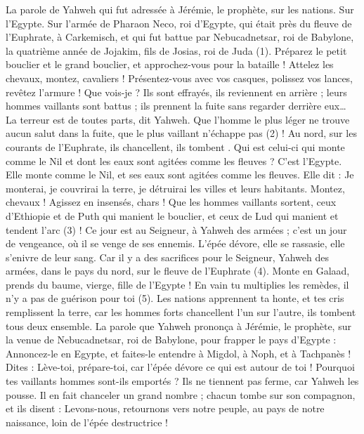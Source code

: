 \begin{multicols}{2}
\VerseOne{}La parole de Yahweh qui fut adressée à Jérémie, le prophète, sur les nations.
Sur l'Egypte. Sur l'armée de Pharaon Neco, roi d'Egypte, qui était près du fleuve de l’Euphrate, à Carkemisch, et qui fut battue par Nebucadnetsar, roi de Babylone, la quatrième année de Jojakim, fils de Josias, roi de Juda\FTNT{} (1).
Préparez le petit bouclier et le grand bouclier, et approchez-vous pour la bataille !
Attelez les chevaux, montez, cavaliers ! Présentez-vous avec vos casques, polissez vos lances, revêtez l’armure !
Que vois-je ? Ils sont effrayés, ils reviennent en arrière ; leurs hommes vaillants sont battus ; ils prennent la fuite sans regarder derrière eux… La terreur est de toutes parts,  dit Yahweh.
Que l'homme le plus léger ne trouve aucun salut dans la fuite, que le plus vaillant n’échappe pas\FTNT{} (2) ! Au nord, sur les courants de l'Euphrate, ils chancellent, ils tombent .
Qui est celui-ci qui monte comme le Nil et dont les eaux sont agitées comme les fleuves ?
C'est l'Egypte. Elle monte comme le Nil, et ses eaux sont agitées comme les fleuves. Elle dit : Je monterai, je couvrirai la terre, je détruirai les villes et leurs habitants.
Montez, chevaux ! Agissez en insensés, chars ! Que les hommes vaillants sortent, ceux d’Ethiopie et de Puth qui manient le bouclier, et ceux de  Lud qui manient et tendent l'arc\FTNT{} (3) !
Ce jour est au Seigneur, à Yahweh des armées ; c’est un jour de vengeance, où il se venge de ses ennemis. L'épée dévore, elle se rassasie, elle s’enivre de leur sang. Car il y a des sacrifices pour le Seigneur, Yahweh des armées, dans le pays du nord, sur le fleuve de l’Euphrate\FTNT{} (4).
Monte en Galaad, prends du baume, vierge, fille de l'Egypte ! En vain tu multiplies les remèdes, il n'y a pas de guérison pour toi\FTNT{} (5).
Les nations apprennent ta honte, et tes cris remplissent la terre, car les hommes forts chancellent l’un sur l’autre, ils tombent tous deux ensemble.
La parole que Yahweh prononça à Jérémie, le prophète, sur la venue de Nebucadnetsar, roi de Babylone, pour frapper le pays d'Egypte :
Annoncez-le en Egypte, et faites-le entendre à Migdol, à Noph, et à Tachpanès ! Dites : Lève-toi, prépare-toi, car l'épée dévore ce qui est autour de toi !
Pourquoi tes vaillants hommes sont-ils emportés ? Ils ne tiennent pas ferme, car Yahweh les pousse.
Il en fait chanceler un grand nombre ; chacun tombe sur son compagnon, et ils disent : Levons-nous, retournons vers notre peuple, au pays de notre naissance, loin de l'épée destructrice !

\end{multicols}
